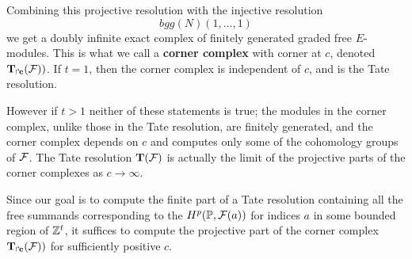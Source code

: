 \documentclass[twoside,12pt, leqno]{amsart}
\def\PP{{\mathbb P}}
\def\cornerT#1{{T_{\Rsh \kern -1pt #1}}}
\def\bT{{\bf T}}
\begin{document}
Combining this projective resolution  
 with the injective resolution 
 $$
 bgg(N)(1,\ldots,1)
 $$
   we get a doubly infinite exact complex of finitely generated graded free $E$-modules.
This is what we call a {\bf corner complex} with corner at $c$, denoted
${\bf \cornerT c} (\sF))$. If $t=1$, then the corner complex
is independent of $c$, and is the Tate resolution. 

However if $t>1$ neither of these statements is true; the modules in the corner complex, unlike those in the Tate resolution, are finitely generated, and the corner complex depends  on $c$ and computes only
some of the cohomology groups of ${\mathcal F}$. The Tate resolution  $\bT(\sF)$ is actually 
 the limit of the projective parts of the corner complexes as  $c \to \infty$.
 
 Since our goal is to compute the finite part of a Tate resolution containing all the free summands corresponding to the $H^p(\PP, \sF(a))$ for  indices $a$ in some bounded region of ${\mathbb Z}^t$, 
it suffices to compute the projective part of the corner complex ${\bf \cornerT c} (\sF))$ for sufficiently
positive $c$.
\end{document}
